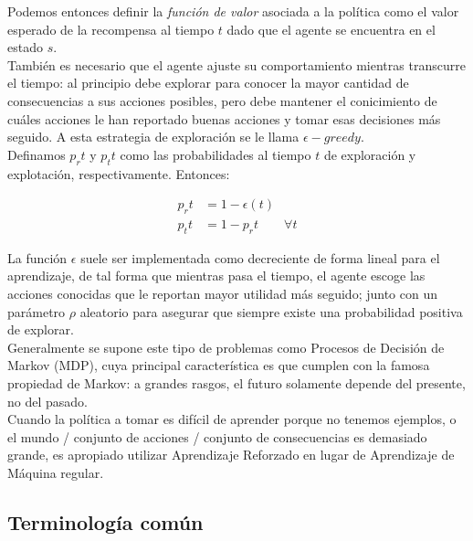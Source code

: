 Podemos entonces definir la \textit{funci\'on de valor} asociada a la pol\'itica como el valor esperado de la recompensa al tiempo $t$ dado que el agente se encuentra en el estado $s$.\\




Tambi\'en es necesario que el agente ajuste su comportamiento mientras transcurre el tiempo: al principio debe explorar para conocer la mayor cantidad de consecuencias a sus acciones posibles, pero debe mantener el conicimiento de cu\'ales acciones le han reportado buenas acciones y tomar esas decisiones m\'as seguido. A esta estrategia de exploraci\'on se le llama $\epsilon-greedy$.\\

Definamos $p_r{t}$ y $p_t{t}$ como las probabilidades al tiempo $t$ de exploraci\'on y explotaci\'on, respectivamente. Entonces:

\vspace{-30pt}
\begin{align*}
p_r{t} &= 1 - \epsilon(t) \\
p_t{t} &= 1 - p_r{t} \quad \quad \forall t
\end{align*}

La funci\'on $\epsilon$ suele ser implementada como decreciente de forma lineal para el aprendizaje,  de tal forma que mientras pasa el tiempo, el agente escoge las acciones conocidas que le reportan mayor utilidad m\'as seguido; junto con un par\'ametro $\rho$ aleatorio para asegurar que siempre existe una probabilidad positiva de explorar.\\

Generalmente se supone este tipo de problemas como Procesos de Decisi\'on de Markov (MDP), cuya principal caracter\'istica es que cumplen con la famosa propiedad de Markov: a grandes rasgos, el futuro solamente depende del presente, no del pasado.\\


Cuando la pol\'itica a tomar es dif\'icil de aprender porque no tenemos ejemplos, o el mundo / conjunto de acciones / conjunto de consecuencias es demasiado grande, es apropiado utilizar Aprendizaje Reforzado en lugar de Aprendizaje de M\'aquina regular.

\subsection{Terminolog\'ia com\'un}

